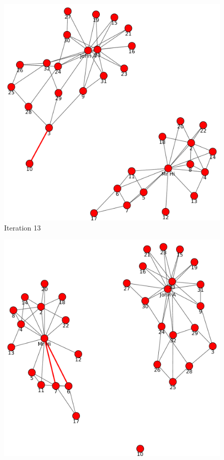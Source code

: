 \begin{itemize}
\begin{figure}[h!]
\begin{center}
\includegraphics[scale=0.55, keepaspectratio=true]{figures/graphs/EdgeHighlightedGraph13.pdf}
\caption{Iteration 13}
\label{fig:q2fig2}
\end{center}
\end{figure}
\newpage
\begin{figure}[h!]
\begin{center}
\includegraphics[scale=0.55, keepaspectratio=true]{figures/graphs/EdgeHighlightedGraph14.pdf}

\end{center}
\end{figure}
\end{itemize}
